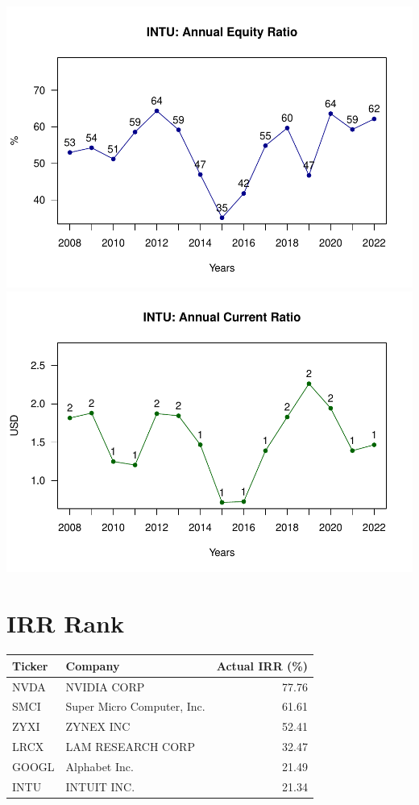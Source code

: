 \documentclass[
]{book}
\begin{document}
\includegraphics{_main_files/figure-latex/unnamed-chunk-1-29.pdf}
\includegraphics{_main_files/figure-latex/unnamed-chunk-1-30.pdf}

\hypertarget{irr-rank}{%
\chapter{IRR Rank}\label{irr-rank}}

\begin{tabular}{l|l|r}
\hline
Ticker & Company & Actual IRR (\%)\\
\hline
NVDA & NVIDIA CORP & 77.76\\
\hline
SMCI & Super Micro Computer, Inc. & 61.61\\
\hline
ZYXI & ZYNEX INC & 52.41\\
\hline
LRCX & LAM RESEARCH CORP & 32.47\\
\hline
GOOGL & Alphabet Inc. & 21.49\\
\hline
INTU & INTUIT INC. & 21.34\\
\hline
\end{tabular}
\end{document}
